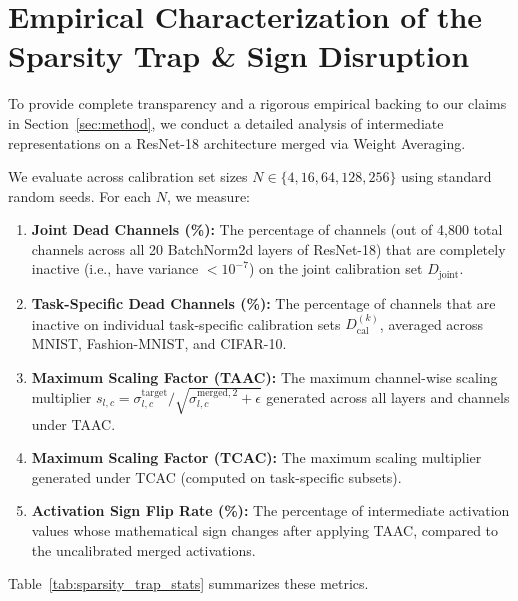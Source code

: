 \documentclass{article}
\theoremstyle{plain}
\theoremstyle{definition}
\theoremstyle{remark}
\begin{document}
\nocite{*}



\clearpage
\appendix
\section{Empirical Characterization of the Sparsity Trap \& Sign Disruption}
\label{sec:appendix_sparsity}

To provide complete transparency and a rigorous empirical backing to our claims in Section~\ref{sec:method}, we conduct a detailed analysis of intermediate representations on a ResNet-18 architecture merged via Weight Averaging. 

We evaluate across calibration set sizes $N \in \{4, 16, 64, 128, 256\}$ using standard random seeds. For each $N$, we measure:
\begin{enumerate}
    \item \textbf{Joint Dead Channels (\%):} The percentage of channels (out of 4,800 total channels across all 20 BatchNorm2d layers of ResNet-18) that are completely inactive (i.e., have variance $< 10^{-7}$) on the joint calibration set $D_{\text{joint}}$.
    \item \textbf{Task-Specific Dead Channels (\%):} The percentage of channels that are inactive on individual task-specific calibration sets $D_{\text{cal}}^{(k)}$, averaged across MNIST, Fashion-MNIST, and CIFAR-10.
    \item \textbf{Maximum Scaling Factor (TAAC):} The maximum channel-wise scaling multiplier $s_{l,c} = \sigma_{l,c}^{\text{target}} / \sqrt{\sigma_{l,c}^{\text{merged},2} + \epsilon}$ generated across all layers and channels under TAAC.
    \item \textbf{Maximum Scaling Factor (TCAC):} The maximum scaling multiplier generated under TCAC (computed on task-specific subsets).
    \item \textbf{Activation Sign Flip Rate (\%):} The percentage of intermediate activation values whose mathematical sign changes after applying TAAC, compared to the uncalibrated merged activations.
\end{enumerate}
Table~\ref{tab:sparsity_trap_stats} summarizes these metrics.
\end{document}
